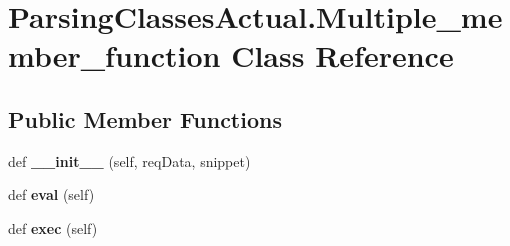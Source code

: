 \hypertarget{class_parsing_classes_actual_1_1_multiple__member__function}{}\section{Parsing\+Classes\+Actual.\+Multiple\+\_\+member\+\_\+function Class Reference}
\label{class_parsing_classes_actual_1_1_multiple__member__function}
\subsection*{Public Member Functions}
\begin{DoxyCompactItemize}
\item 
def {\bfseries \+\_\+\+\_\+init\+\_\+\+\_\+} (self, req\+Data, snippet)\hypertarget{class_parsing_classes_actual_1_1_multiple__member__function_a27da0e19523b0219e7d58cd7dbabc9a9}{}\label{class_parsing_classes_actual_1_1_multiple__member__function_a27da0e19523b0219e7d58cd7dbabc9a9}

\item 
def {\bfseries eval} (self)\hypertarget{class_parsing_classes_actual_1_1_multiple__member__function_a8d3e7a3f25b30947e82604271ad6c49d}{}\label{class_parsing_classes_actual_1_1_multiple__member__function_a8d3e7a3f25b30947e82604271ad6c49d}

\item 
def {\bfseries exec} (self)\hypertarget{class_parsing_classes_actual_1_1_multiple__member__function_a3bc26d567ef38186228536c4234281ec}{}\label{class_parsing_classes_actual_1_1_multiple__member__function_a3bc26d567ef38186228536c4234281ec}

\end{DoxyCompactItemize}
